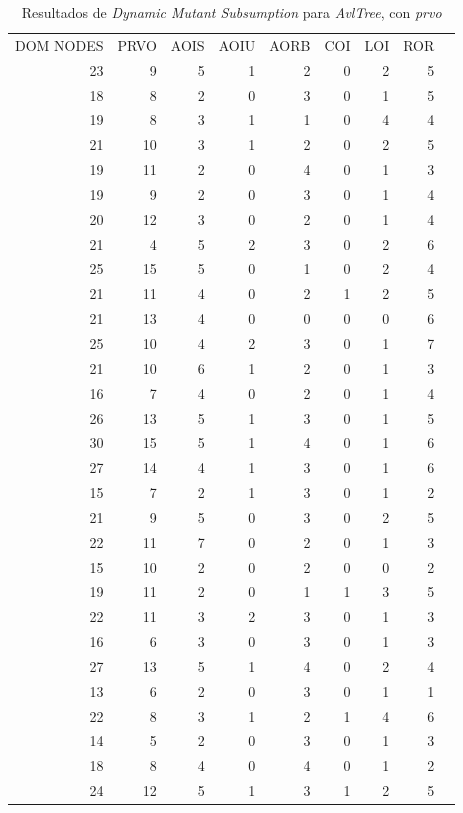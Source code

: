 \begin{table}[]
	\caption{Resultados de \emph{Dynamic Mutant Subsumption} para \emph{AvlTree}, con \emph{prvo}}
	\label{tables.results.subsumption.avltree.prvo}
	\centering
	\scriptsize
	\def\arraystretch{0.95}
	\setlength\tabcolsep{0.5mm}
	\begin{tabular}{rrrrrrrrr}
		DOM NODES & PRVO & AOIS & AOIU & AORB & COI & LOI & ROR \\
		23 & 9 & 5 & 1 & 2 & 0 & 2 & 5 \\
		18 & 8 & 2 & 0 & 3 & 0 & 1 & 5 \\
		19 & 8 & 3 & 1 & 1 & 0 & 4 & 4 \\
		21 & 10 & 3 & 1 & 2 & 0 & 2 & 5 \\
		19 & 11 & 2 & 0 & 4 & 0 & 1 & 3 \\
		19 & 9 & 2 & 0 & 3 & 0 & 1 & 4 \\
		20 & 12 & 3 & 0 & 2 & 0 & 1 & 4 \\
		21 & 4 & 5 & 2 & 3 & 0 & 2 & 6 \\
		25 & 15 & 5 & 0 & 1 & 0 & 2 & 4 \\
		21 & 11 & 4 & 0 & 2 & 1 & 2 & 5 \\
		21 & 13 & 4 & 0 & 0 & 0 & 0 & 6 \\
		25 & 10 & 4 & 2 & 3 & 0 & 1 & 7 \\
		21 & 10 & 6 & 1 & 2 & 0 & 1 & 3 \\
		16 & 7 & 4 & 0 & 2 & 0 & 1 & 4 \\
		26 & 13 & 5 & 1 & 3 & 0 & 1 & 5 \\
		30 & 15 & 5 & 1 & 4 & 0 & 1 & 6 \\
		27 & 14 & 4 & 1 & 3 & 0 & 1 & 6 \\
		15 & 7 & 2 & 1 & 3 & 0 & 1 & 2 \\
		21 & 9 & 5 & 0 & 3 & 0 & 2 & 5 \\
		22 & 11 & 7 & 0 & 2 & 0 & 1 & 3 \\
		15 & 10 & 2 & 0 & 2 & 0 & 0 & 2 \\
		19 & 11 & 2 & 0 & 1 & 1 & 3 & 5 \\
		22 & 11 & 3 & 2 & 3 & 0 & 1 & 3 \\
		16 & 6 & 3 & 0 & 3 & 0 & 1 & 3 \\
		27 & 13 & 5 & 1 & 4 & 0 & 2 & 4 \\
		13 & 6 & 2 & 0 & 3 & 0 & 1 & 1 \\
		22 & 8 & 3 & 1 & 2 & 1 & 4 & 6 \\
		14 & 5 & 2 & 0 & 3 & 0 & 1 & 3 \\
		18 & 8 & 4 & 0 & 4 & 0 & 1 & 2 \\
		24 & 12 & 5 & 1 & 3 & 1 & 2 & 5
	\end{tabular}
\end{table}

